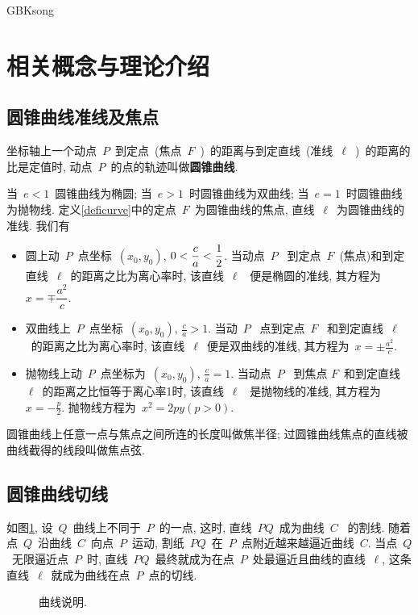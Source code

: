 \documentclass[a4paper, 12pt, twoside]{ctexart}
\begin{document}
\begin{CJK*}{GBK}{song}
\newpage %
\tableofcontents      %
\newpage %

\newpage
\section{相关概念与理论介绍}
\subsection{圆锥曲线准线及焦点}

    \begin{defi}[圆锥曲线统一定义]\label{deficurve}
        \textup{坐标轴上一个动点~$P$~到定点~(焦点~$F$~)~的距离与到定直线~(准线~$\ell$~)~的距离的比是定值时, 动点~$P$~的点的轨迹叫做\textbf{圆锥曲线}.}
    \end{defi}

    当~$e<1$~圆锥曲线为椭圆; 当~$e>1$~时圆锥曲线为双曲线; 当~$e=1$~时圆锥曲线为抛物线. 定义\ref{deficurve}中的定点~$F$~为圆锥曲线的焦点, 直线~$\ell$~为圆锥曲线的准线. 我们有
     \begin{itemize}
     \item 圆上动~$P$~点坐标~$(x_0, y_0)$, $0<\dfrac ca<\displaystyle\frac 12$. 当动点~$P$~ 到定点~$F$~(焦点)和到定直线~$\ell$~的距离之比为离心率时, 该直线~$\ell$~ 便是椭圆的准线, 其方程为~$x=\mp \dfrac{a^2}{c}$.
     \item 双曲线上~$P$~点坐标~$(x_0, y_0)$, $\frac{c}{a}>1$. 当动~$P$~ 点到定点~$F$~ 和到定直线~$\ell$~的距离之比为离心率时, 该直线~$\ell$~便是双曲线的准线, 其方程为~$x=\pm \frac{a^2}{c}$.
     \item 抛物线上动~$P$~点坐标为~$(x_0,y_0)$, $\frac{c}{a}=1$. 当动点~$P$~ 到焦点 $F$~和到定直线~$\ell$~的距离之比恒等于离心率1时,  该直线~$\ell$~ 是抛物线的准线, 其方程为~$x=-\frac{p}{2}$. 抛物线方程为~$x^2=2py(p>0)$.
     \end{itemize}

     圆锥曲线上任意一点与焦点之间所连的长度叫做焦半径; 过圆锥曲线焦点的直线被曲线截得的线段叫做焦点弦.
\subsection{圆锥曲线切线}
    如图\ref{fig1}, 设~$Q$~曲线上不同于~$P$~的一点, 这时, 直线~$PQ$~成为曲线~$C$~ 的割线. 随着点~$Q$~沿曲线~$C$~向点~$P$~运动, 割纸~$PQ$~在~$P$~点附近越来越逼近曲线~$C$. 当点~$Q$~无限逼近点~$P$~时, 直线~$PQ$~最终就成为在点~$P$~处最逼近且曲线的直线~$\ell$, 这条直线~$\ell$~就成为曲线在点~$P$~点的切线.
    \begin{figure}[H]
    \centering                           %
      \caption{\label{fig1} 曲线说明.}
    \end{figure}




\end{CJK*}
\end{document}
